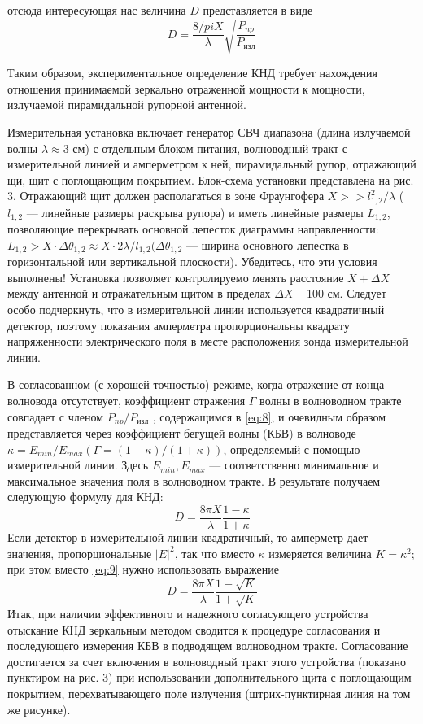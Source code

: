 отсюда интересующая нас величина $D$ представляется в виде 
\begin{equation}
    D = \frac{8/pi X}{\lambda}\sqrt{\frac{P_{np}}{P_{\text{изл}}}}
    \label{eq:8}
\end{equation}

Таким образом, экспериментальное определение КНД требует нахождения отношения принимаемой зеркально отраженной мощности 
к мощности, излучаемой пирамидальной рупорной антенной. 

Измерительная установка включает генератор СВЧ диапазона (длина излучаемой волны $\lambda \approx$3 см) с отдельным 
блоком питания, волноводный тракт с измерительной линией и амперметром к ней, пирамидальный рупор, отражающий щи, 
щит с поглощающим покрытием. Блок-схема установки представлена на рис. 3. Отражающий щит должен располагаться в зоне 
Фраунгофера $X>>l_{1,2}^2/\lambda$ ($l_{1,2}$ — линейные размеры раскрыва рупора) и иметь линейные 
размеры $L_{1,2}$, позволяющие перекрывать основной лепесток диаграммы направленности:
 $ L_{1,2}>X \cdot \Delta \theta_{1,2} \approx X \cdot 2 \lambda / l_{1,2} (\Delta \theta_{1,2}$
— ширина основного лепестка в горизонтальной или вертикальной плоскости). Убедитесь, что эти условия выполнены! 
Установка позволяет контролируемо менять расстояние $X + \Delta X$ между антенной и отражательным щитом в пределах $\Delta X$ ~ 100 см. 
Следует особо подчеркнуть, что в измерительной линии используется квадратичный детектор, поэтому показания амперметра 
пропорциональны квадрату напряженности электрического поля в месте расположения зонда измерительной линии.

В согласованном (с хорошей точностью) режиме, когда отражение от конца волновода отсутствует, коэффициент отражения $\Gamma$ 
волны в волноводном тракте совпадает с членом $P_{np}/P_{\text{изл}}$ , содержащимся в \ref{eq:8}, и очевидным образом 
представляется через коэффициент бегущей волны (КБВ) в волноводе $\kappa = E_{min}/E_{max} (\Gamma= (1-\kappa)/(1+\kappa) )$, 
определяемый с помощью измерительной линии. Здесь $E_{min}, E_{max}$ — соответственно минимальное и максимальное значения 
поля в волноводном тракте. В результате получаем следующую формулу для КНД:
\begin{equation}
    D=\frac{8 \pi X}{\lambda} \frac{1-\kappa}{1+\kappa}
    \label{eq:9}
\end{equation}
Если детектор в измерительной линии квадратичный, то амперметр дает значения, пропорциональные $|E|^2$, так что вместо 
$\kappa$ измеряется величина $K = \kappa^2$; при этом вместо \ref{eq:9} нужно использовать выражение
\begin{equation}
    D=\frac{8 \pi X}{\lambda} \frac{1-\sqrt{K}}{1+\sqrt{K}}
    \label{eq:10}
\end{equation}
Итак, при наличии эффективного и надежного согласующего устройства отыскание КНД зеркальным методом сводится к 
процедуре согласования и последующего измерения КБВ в подводящем волноводном тракте. Согласование достигается за 
счет включения в волноводный тракт этого устройства (показано пунктиром на рис. 3) при использовании дополнительного 
щита с поглощающим покрытием, перехватывающего поле излучения (штрих-пунктирная линия на том же рисунке).


